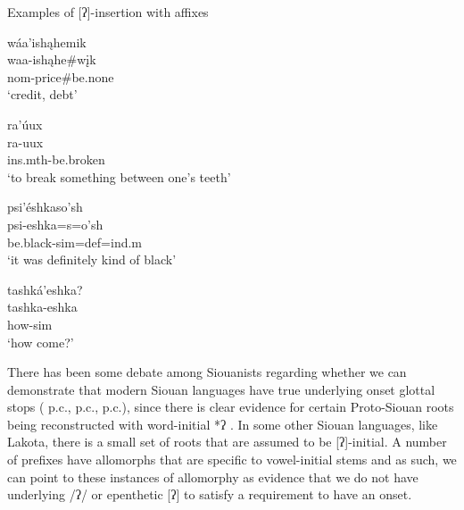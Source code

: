 \begin{exe}
\item\label{glottalstopsuffixCh2} Examples of [ʔ]-insertion with affixes

	\begin{xlist}

	\item\label{glottalstopsuffixCh2A} \glll wáa'ishąhemik\\
		waa-ishąhe\#wįk\\
		nom-\textnormal{price}\#\textnormal{be.none}\\
		\glt `credit, debt' \citep[288]{hollow1970}

	\item\label{glottalstopsuffixCh2B} \glll ra'úux\\
		ra-uux\\
		ins.mth-\textnormal{be.broken}\\
		\glt `to break something between one's teeth' \citep[264]{hollow1970}

	\item\label{glottalstopsuffixCh2C} \glll psi'éshkaso'sh\\
		psi-eshka=s=o'sh\\
		\textnormal{be.black}-sim=def=ind.m\\
		\glt `it was definitely kind of black' \citep[434]{hollow1970}

	\item\label{glottalstopsuffixCh2D} \glll tashká'eshka?\\
		tashka-eshka\\
		\textnormal{how}-sim\\
		\glt `how come?' \citep[42]{hollow1973a}

	\end{xlist}

\end{exe}

There has been some debate among Siouanists regarding whether we can demonstrate that modern Siouan languages have true underlying onset glottal stops (\citeauthor{larson2016} p.c., \citeauthor{mirzayan2010} p.c., \citeauthor{ullrich2011} p.c.), since there is clear evidence for certain Proto-Siouan roots being reconstructed with word-initial *ʔ \citep{rankin2015}. In some other Siouan languages, like Lakota, there is a small set of roots that are assumed to be [ʔ]-initial. A number of prefixes have allomorphs that are specific to vowel-initial stems and as such, we can point to these instances of allomorphy as evidence that we do not have underlying /ʔ/ or epenthetic [ʔ] to satisfy a requirement to have an onset.

